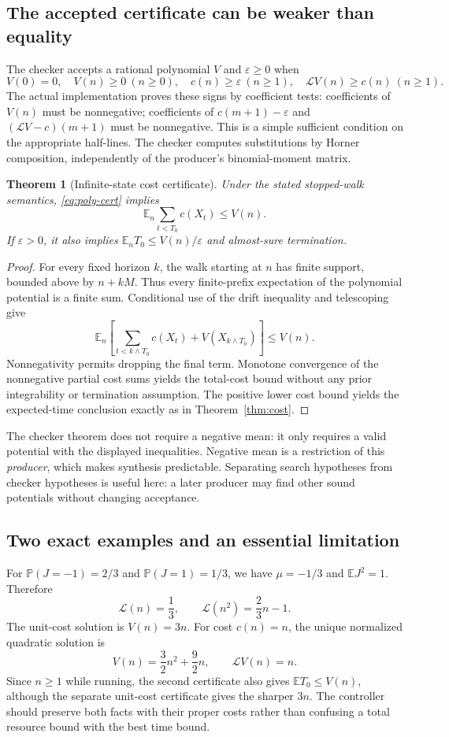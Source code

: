 \documentclass[11pt,letterpaper]{article}
\newtheorem{theorem}{Theorem}[section]
\theoremstyle{definition}\newtheorem{definition}[theorem]{Definition}
\theoremstyle{remark}\newtheorem{remark}[theorem]{Remark}
\newcommand{\E}{\mathbb E}\newcommand{\Prob}{\mathbb P}
\begin{document}
\subsection{The accepted certificate can be weaker than equality}
The checker accepts a rational polynomial $V$ and $\varepsilon\ge0$ when
\begin{equation}\label{eq:poly-cert}
 V(0)=0,\quad V(n)\ge0\ (n\ge0),\quad
 c(n)\ge\varepsilon\ (n\ge1),\quad
 \mathcal L V(n)\ge c(n)\ (n\ge1).
\end{equation}
The actual implementation proves these signs by coefficient tests: coefficients of $V(n)$ must be nonnegative; coefficients of $c(m+1)-\varepsilon$ and $(\mathcal L V-c)(m+1)$ must be nonnegative. This is a simple sufficient condition on the appropriate half-lines. The checker computes substitutions by Horner composition, independently of the producer's binomial-moment matrix.

\begin{theorem}[Infinite-state cost certificate]\label{thm:walk}
Under the stated stopped-walk semantics, \eqref{eq:poly-cert} implies
\[
 \E_n\sum_{t<T_0}c(X_t)\le V(n).
\]
If $\varepsilon>0$, it also implies $\E_n T_0\le V(n)/\varepsilon$ and almost-sure termination.
\end{theorem}
\begin{proof}
For every fixed horizon $k$, the walk starting at $n$ has finite support, bounded above by $n+kM$. Thus every finite-prefix expectation of the polynomial potential is a finite sum. Conditional use of the drift inequality and telescoping give
\[
 \E_n\!\left[\sum_{t<k\wedge T_0}c(X_t)+V(X_{k\wedge T_0})\right]\le V(n).
\]
Nonnegativity permits dropping the final term. Monotone convergence of the nonnegative partial cost sums yields the total-cost bound without any prior integrability or termination assumption. The positive lower cost bound yields the expected-time conclusion exactly as in Theorem~\ref{thm:cost}.
\end{proof}
The checker theorem does not require a negative mean: it only requires a valid potential with the displayed inequalities. Negative mean is a restriction of this \emph{producer}, which makes synthesis predictable. Separating search hypotheses from checker hypotheses is useful here: a later producer may find other sound potentials without changing acceptance.

\subsection{Two exact examples and an essential limitation}
For $\Prob(J=-1)=2/3$ and $\Prob(J=1)=1/3$, we have $\mu=-1/3$ and $\E J^2=1$. Therefore
\[
 \mathcal L(n)=\frac13,
 \qquad \mathcal L(n^2)=\frac23n-1.
\]
The unit-cost solution is $V(n)=3n$. For cost $c(n)=n$, the unique normalized quadratic solution is
\[
 V(n)=\frac32n^2+\frac92n,
 \qquad \mathcal LV(n)=n.
\]
Since $n\ge1$ while running, the second certificate also gives $\E T_0\le V(n)$, although the separate unit-cost certificate gives the sharper $3n$. The controller should preserve both facts with their proper costs rather than confusing a total resource bound with the best time bound.
\end{document}
